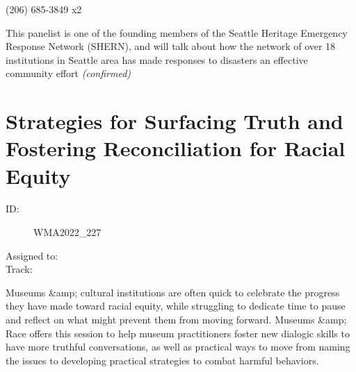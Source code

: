 \documentclass{report}
\begin{document}
                (206) 685-3849 x2\newline

                This panelist is one of the founding members of the Seattle Heritage Emergency Response Network (SHERN), and will talk about how the network of over 18 institutions in Seattle area has made responses to disasters an effective community effort
                \emph{ (confirmed) }
              

              
        
          \newpage
          \section{ Strategies for Surfacing Truth and Fostering Reconciliation for Racial Equity }
            \begin{description}
              \item [ID:]
              WMA2022\_227

              \item [Assigned to:]
                \item [Track:]
              \end{description}

              Museums \&amp; cultural institutions are often quick to celebrate the progress they have made toward racial equity, while struggling to dedicate time to pause and reflect on what might prevent them from moving forward. Museums \&amp; Race offers this session to help museum practitioners foster new dialogic skills to have more truthful conversations, as well as practical ways to move from naming the issues to developing practical strategies to combat harmful behaviors.
\end{document}

